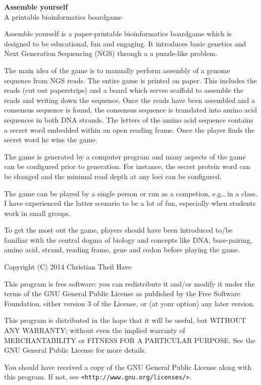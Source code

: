 \begin{titlepage}
\begin{center}
	{ \huge \bfseries Assemble yourself  \\[0.4cm] }
	A printable bioinformatics boardgame
\end{center}
{\large

Assemble yourself is a paper-printable bioinformatics boardgame which is designed to be educational, fun and engaging. 
It introduces basic genetics and Next Generation Sequencing (NGS) through a a puzzle-like problem. 

The main idea of the game is to manually perform assembly of a genome sequence
from NGS reads. The entire game is printed on paper. This includes the reads (cut out paperstrips) 
and a board which serves scaffold to assemble the reads and writing down the sequence.
Once the reads have been assembled and a consensus sequence is found, the consensus
sequence is translated into amino acid sequences in both DNA strands. The letters
of the amino acid sequence contains a secret word embedded within an open reading frame. 
Once the player finds the secret word he wins the game. 

The game is generated by a computer program and many aspects of the game can 
be configured prior to generation. For instance, the secret protein word
can be changed and the minimal read depth at any loci can be configured. 

The game can be played by a single person or run as a competion, e.g.,  in a class. I have experienced
the latter scenario to be a lot of fun, especially when students work in small groups. 

To get the most out the game, players should have been introduced to/be familiar with the central dogma of biology
and concepts like DNA, base-pairing, amino acid, strand, reading frame, gene and codon before playing the game.

}

\vfill 
{\small
Copyright (C) 2014 Christian Theil Have

This program is free software: you can redistribute it and/or modify
it under the terms of the GNU General Public License as published by
the Free Software Foundation, either version 3 of the License, or
(at your option) any later version.

This program is distributed in the hope that it will be useful,
but WITHOUT ANY WARRANTY; without even the implied warranty of
MERCHANTABILITY or FITNESS FOR A PARTICULAR PURPOSE.  See the
GNU General Public License for more details.

You should have received a copy of the GNU General Public License
along with this program.  If not, see \verb|<http://www.gnu.org/licenses/>|.
}

\end{titlepage}

